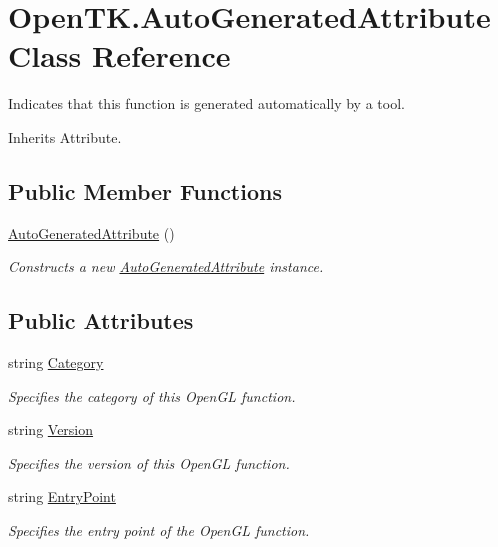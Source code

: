 \hypertarget{class_open_t_k_1_1_auto_generated_attribute}{\section{Open\-T\-K.\-Auto\-Generated\-Attribute Class Reference}
\label{class_open_t_k_1_1_auto_generated_attribute}
}


Indicates that this function is generated automatically by a tool.  




Inherits Attribute.

\subsection*{Public Member Functions}
\begin{DoxyCompactItemize}
\item 
\hyperlink{class_open_t_k_1_1_auto_generated_attribute_a9f3ae68e469434d2631d4292095ef141}{Auto\-Generated\-Attribute} ()
\begin{DoxyCompactList}\small\item\em Constructs a new \hyperlink{class_open_t_k_1_1_auto_generated_attribute}{Auto\-Generated\-Attribute} instance. \end{DoxyCompactList}\end{DoxyCompactItemize}
\subsection*{Public Attributes}
\begin{DoxyCompactItemize}
\item 
string \hyperlink{class_open_t_k_1_1_auto_generated_attribute_a679d0697572407f2883d89d3ea5de1af}{Category}
\begin{DoxyCompactList}\small\item\em Specifies the category of this Open\-G\-L function. \end{DoxyCompactList}\item 
string \hyperlink{class_open_t_k_1_1_auto_generated_attribute_a4def6ef24fb3d01fbde483d81d57edc9}{Version}
\begin{DoxyCompactList}\small\item\em Specifies the version of this Open\-G\-L function. \end{DoxyCompactList}\item 
string \hyperlink{class_open_t_k_1_1_auto_generated_attribute_ac30396fa02f88714f2d7b343e9d965c3}{Entry\-Point}
\begin{DoxyCompactList}\small\item\em Specifies the entry point of the Open\-G\-L function. \end{DoxyCompactList}\end{DoxyCompactItemize}


